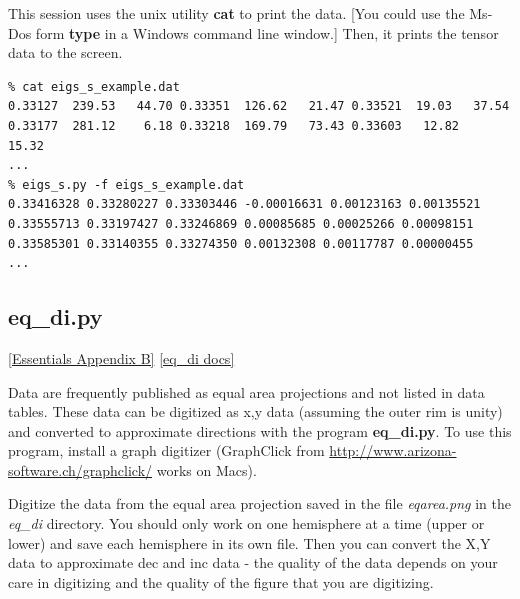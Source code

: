 \documentclass[11pt]{book}
\begin{document}
{{This session uses the unix utility {\bf cat} to print the data.  [You could use the Ms-Dos
form {\bf type} in a Windows command line window.]    Then, it prints the tensor data to the screen.

\begin{verbatim}
% cat eigs_s_example.dat
0.33127  239.53   44.70 0.33351  126.62   21.47 0.33521  19.03   37.54
0.33177  281.12    6.18 0.33218  169.79   73.43 0.33603   12.82   15.32
...
% eigs_s.py -f eigs_s_example.dat
0.33416328 0.33280227 0.33303446 -0.00016631 0.00123163 0.00135521
0.33555713 0.33197427 0.33246869 0.00085685 0.00025266 0.00098151
0.33585301 0.33140355 0.33274350 0.00132308 0.00117787 0.00000455
...
\end{verbatim}





%
\subsection{eq\_di.py}
\href{http://earthref.org/MAGIC/books/Tauxe/Essentials/WebBook3.html#equal_area}{[Essentials Appendix B]}
\href{https://github.com/PmagPy/PmagPy/blob/master/programs/eq_di.py}{[eq\_di docs]}

Data are frequently  published as equal area projections and not listed in data tables.  These data can be digitized as x,y data (assuming the outer rim is unity) and converted to approximate directions with the program {\bf eq\_di.py}.  To use this program, install a graph digitizer (GraphClick from \url{http://www.arizona-software.ch/graphclick/} works on Macs).

Digitize the data from the equal area projection saved in the file {\it eqarea.png} in the {\it eq\_di} directory.
You should only work on one hemisphere at a time (upper or lower) and save each hemisphere in its own file.  Then you can convert the X,Y data to approximate dec and inc data - the quality of the data depends on your care in digitizing and the quality of the figure that you are digitizing.

}}
\end{document}
